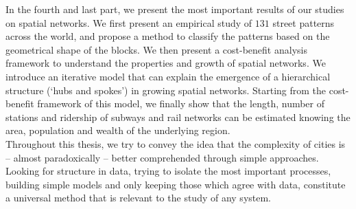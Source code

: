 In the fourth and last part, we present the most important results of our
studies on spatial networks. We first present an empirical
study of $131$ street patterns across the world, and propose a method to
classify the patterns based on the geometrical shape of the blocks. We then present a cost-benefit
analysis framework to understand the properties and growth of spatial networks.
We introduce an iterative model that can explain the emergence of a hierarchical
structure (`hubs and spokes') in growing spatial networks. Starting from the
cost-benefit framework of this model, we finally show that the length, number of
stations and ridership of subways and rail networks can be estimated knowing the
area, population and wealth of the underlying region.\\

Throughout this thesis, we try to convey the idea that the complexity of cities is --
almost paradoxically -- better comprehended through simple approaches. 
Looking for structure in data, trying to isolate the most important processes,
building simple models and only keeping those which agree with data, constitute
a universal method that is relevant to the study of any system.


\endgroup			

\vfill
